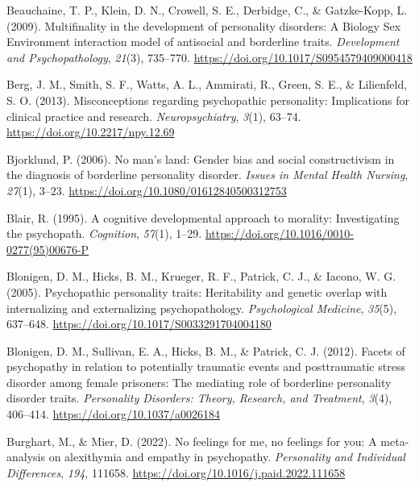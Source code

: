 \documentclass[
  man,floatsintext]{apa7}
\newlength{\cslhangindent}
\newlength{\cslentryspacingunit} %
\newenvironment{CSLReferences}[2] %
 {%
  \setlength{\parindent}{0pt}
  \ifodd #1
  \let\oldpar\par
  \def\par{\hangindent=\cslhangindent\oldpar}
  \fi
  \setlength{\parskip}{#2\cslentryspacingunit}
 }%
 {}
\begin{document}
\begin{CSLReferences}{1}{0}
\leavevmode{}%
Beauchaine, T. P., Klein, D. N., Crowell, S. E., Derbidge, C., \& Gatzke-Kopp, L. (2009). Multifinality in the development of personality disorders: {A Biology} {\texttimes} {Sex} {\texttimes} {Environment} interaction model of antisocial and borderline traits. \emph{Development and Psychopathology}, \emph{21}(3), 735--770. \url{https://doi.org/10.1017/S0954579409000418}

\leavevmode{}%
Berg, J. M., Smith, S. F., Watts, A. L., Ammirati, R., Green, S. E., \& Lilienfeld, S. O. (2013). Misconceptions regarding psychopathic personality: Implications for clinical practice and research. \emph{Neuropsychiatry}, \emph{3}(1), 63--74. \url{https://doi.org/10.2217/npy.12.69}

\leavevmode{}%
Bjorklund, P. (2006). No man's land: Gender bias and social constructivism in the diagnosis of borderline personality disorder. \emph{Issues in Mental Health Nursing}, \emph{27}(1), 3--23. \url{https://doi.org/10.1080/01612840500312753}

\leavevmode{}%
Blair, R. (1995). A cognitive developmental approach to morality: Investigating the psychopath. \emph{Cognition}, \emph{57}(1), 1--29. \url{https://doi.org/10.1016/0010-0277(95)00676-P}

\leavevmode{}%
Blonigen, D. M., Hicks, B. M., Krueger, R. F., Patrick, C. J., \& Iacono, W. G. (2005). Psychopathic personality traits: Heritability and genetic overlap with internalizing and externalizing psychopathology. \emph{Psychological Medicine}, \emph{35}(5), 637--648. \url{https://doi.org/10.1017/S0033291704004180}

\leavevmode{}%
Blonigen, D. M., Sullivan, E. A., Hicks, B. M., \& Patrick, C. J. (2012). Facets of psychopathy in relation to potentially traumatic events and posttraumatic stress disorder among female prisoners: {The} mediating role of borderline personality disorder traits. \emph{Personality Disorders: Theory, Research, and Treatment}, \emph{3}(4), 406--414. \url{https://doi.org/10.1037/a0026184}

\leavevmode{}%
Burghart, M., \& Mier, D. (2022). No feelings for me, no feelings for you: {A} meta-analysis on alexithymia and empathy in psychopathy. \emph{Personality and Individual Differences}, \emph{194}, 111658. \url{https://doi.org/10.1016/j.paid.2022.111658}


\end{CSLReferences}
\end{document}

